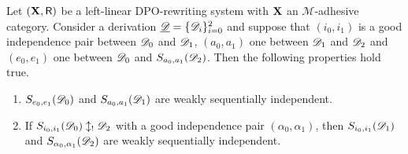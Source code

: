 \begin{lemma}\label{lem:iig1}Let $(\textbf {\textup{X}},\mathsf{R})$ be a left-linear DPO-rewriting system with $\textbf {\textup{X}}$ an $\mathcal{M}$-adhesive category. Consider a derivation $\underline{\mathscr{D}}=\{\mathscr{D}_i\}_{i=0}^2$ and suppose that $(i_0,i_1)$ is a good independence pair between $\mathscr{D}_0$ and $\mathscr{D}_1$, $(a_0,a_1)$ one between $\mathscr{D}_1$ and $\mathscr{D}_2$ and $(e_0, e_1)$ one between $\mathscr{D}_0$ and $S_{a_0,a_1}(\mathscr{D}_2)$. Then the following properties hold true.
	\begin{enumerate}
		\item $S_{e_0,e_1}(\mathscr{D}_0)$ and $S_{a_0,a_1}(\mathscr{D}_1)$ are weakly sequentially independent.
		\item If $S_{i_0, i_1}(\mathscr{D}_0)\updownarrow_! \mathscr{D}_2$ with a good independence pair $(\alpha_0, \alpha_1)$, then  $S_{i_0,i_1}(\mathscr{D}_1)$ and $S_{\alpha_0, \alpha_1}(\mathscr{D}_2)$ are weakly sequentially independent.
	\end{enumerate}
	
\end{lemma}
